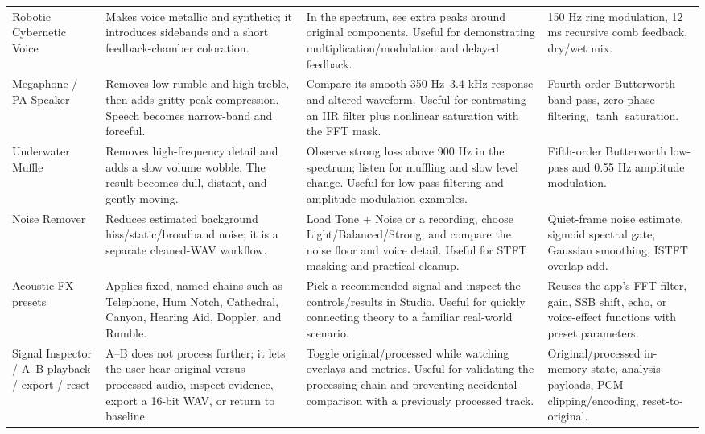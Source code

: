 \documentclass[11pt,a4paper]{article}
\begin{document}
{\begin{longtable}{@{}p{.18\linewidth}p{.27\linewidth}p{.27\linewidth}p{.20\linewidth}@{}}
Robotic Cybernetic Voice & Makes voice metallic and synthetic; it introduces sidebands and a short feedback-chamber coloration. & In the spectrum, see extra peaks around original components. Useful for demonstrating multiplication/modulation and delayed feedback. & 150 Hz ring modulation, 12 ms recursive comb feedback, dry/wet mix.\\

Megaphone / PA Speaker & Removes low rumble and high treble, then adds gritty peak compression. Speech becomes narrow-band and forceful. & Compare its smooth 350 Hz--3.4 kHz response and altered waveform. Useful for contrasting an IIR filter plus nonlinear saturation with the FFT mask. & Fourth-order Butterworth band-pass, zero-phase filtering, \(\tanh\) saturation.\\

Underwater Muffle & Removes high-frequency detail and adds a slow volume wobble. The result becomes dull, distant, and gently moving. & Observe strong loss above 900 Hz in the spectrum; listen for muffling and slow level change. Useful for low-pass filtering and amplitude-modulation examples. & Fifth-order Butterworth low-pass and 0.55 Hz amplitude modulation.\\

Noise Remover & Reduces estimated background hiss/static/broadband noise; it is a separate cleaned-WAV workflow. & Load Tone + Noise or a recording, choose Light/Balanced/Strong, and compare the noise floor and voice detail. Useful for STFT masking and practical cleanup. & Quiet-frame noise estimate, sigmoid spectral gate, Gaussian smoothing, ISTFT overlap-add.\\

Acoustic FX presets & Applies fixed, named chains such as Telephone, Hum Notch, Cathedral, Canyon, Hearing Aid, Doppler, and Rumble. & Pick a recommended signal and inspect the controls/results in Studio. Useful for quickly connecting theory to a familiar real-world scenario. & Reuses the app's FFT filter, gain, SSB shift, echo, or voice-effect functions with preset parameters.\\

Signal Inspector / A--B playback / export / reset & A--B does not process further; it lets the user hear original versus processed audio, inspect evidence, export a 16-bit WAV, or return to baseline. & Toggle original/processed while watching overlays and metrics. Useful for validating the processing chain and preventing accidental comparison with a previously processed track. & Original/processed in-memory state, analysis payloads, PCM clipping/encoding, reset-to-original.\\


\end{longtable}}
\end{document}
